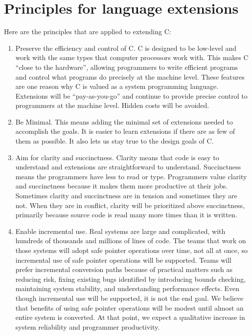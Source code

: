 \documentclass[]{article}
\begin{document}
\section{\texorpdfstring{\protect\hypertarget{ux5fRef416270300}{}{\protect\hypertarget{ux5fToc420589165}{}{\protect\hypertarget{ux5fToc422906946}{}{\protect\hypertarget{ux5fToc424307669}{}{\protect\hypertarget{ux5fToc426641053}{}{\protect\hypertarget{ux5fToc435434913}{}{\protect\hypertarget{ux5fToc437460734}{}{\protect\hypertarget{ux5fToc440445408}{}{\protect\hypertarget{ux5fToc440449190}{}{\protect\hypertarget{ux5fToc440551840}{}{}}}}}}}}}}Principles
for language
extensions}{Principles for language extensions}}\label{principles-for-language-extensions}

Here are the principles that are applied to extending C:

\begin{enumerate}
\def\labelenumi{\arabic{enumi}.}
\item
  Preserve the efficiency and control of C. C is designed to be
  low-level and work with the same types that computer processors work
  with. This makes C ``close to the hardware'', allowing programmers to
  write efficient programs and control what programs do precisely at the
  machine level. These features are one reason why C is valued as a
  system programming language. Extensions will be ``pay-as-you-go'' and
  continue to provide precise control to programmers at the machine
  level. Hidden costs will be avoided.
\item
  Be Minimal. This means adding the minimal set of extensions needed to
  accomplish the goals. It is easier to learn extensions if there are as
  few of them as possible. It also lets us stay true to the design goals
  of C.
\item
  Aim for clarity and succinctness. Clarity means that code is easy to
  understand and extensions are straightforward to understand.
  Succinctness means the programmers have less to read or type.
  Programmers value clarity and succinctness because it makes them more
  productive at their jobs. Sometimes clarity and succinctness are in
  tension and sometimes they are not. When they are in conflict, clarity
  will be prioritized above succinctness, primarily because source code
  is read many more times than it is written.
\item
  Enable incremental use. Real systems are large and complicated, with
  hundreds of thousands and millions of lines of code. The teams that
  work on those systems will adopt safe pointer operations over time,
  not all at once, so incremental use of safe pointer operations will be
  supported. Teams will prefer incremental conversion paths because of
  practical matters such as reducing risk, fixing existing bugs
  identified by introducing bounds checking, maintaining system
  stability, and understanding performance effects. Even though
  incremental use will be supported, it is not the end goal. We believe
  that benefits of using safe pointer operations will be modest until
  almost an entire system is converted. At that point, we expect a
  qualitative increase in system reliability and programmer
  productivity.
\end{enumerate}
\end{document}
